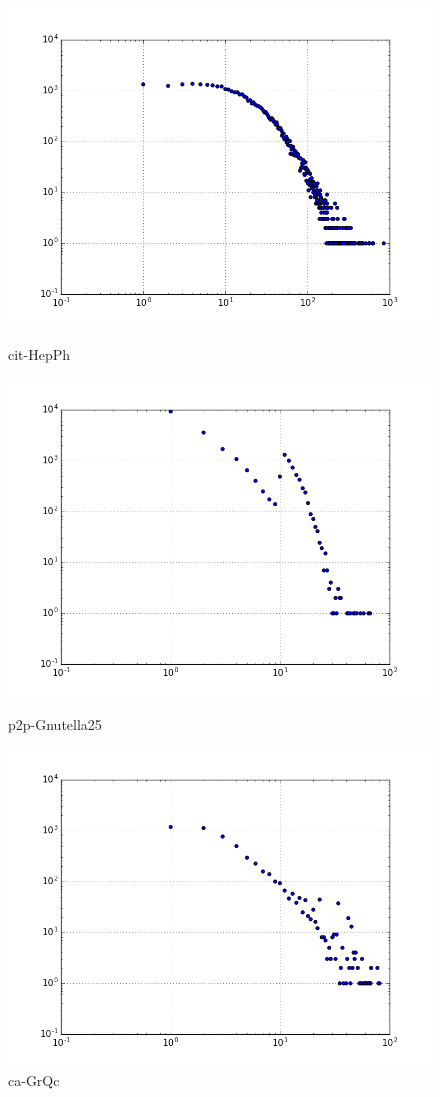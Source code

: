 \begin{figure}[H]
  \includegraphics[width=\linewidth]{img/cit-HepPh/degree_dist.png}
  \caption*{cit-HepPh}
\endminipage\hfill
{}
  \includegraphics[width=\linewidth]{img/p2p-Gnutella25/degree_dist.png}
  \caption*{p2p-Gnutella25}
\endminipage\hfill
{}
  \includegraphics[width=\linewidth]{img/ca-GrQc/degree_dist.png}
  \caption*{ca-GrQc}
\endminipage
\end{figure}

